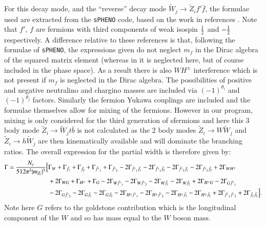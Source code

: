 \documentclass[final,3p,times,pdflatex]{elsarticle}
\begin{document}
For this decay mode, and the ``reverse'' decay mode $\tilde{W}_j \rightarrow
\tilde{Z}_i f' \bar{f}$, the formulae used are extracted from the {\tt sPHENO}
code, based on the work in references \cite{Baer:1998, TataBaer}. Note that
$f'$, $f$ are fermions with third components of weak isospin $1 \over 2$ and
$-{1 \over 2}$ respectively. A difference relative to these references is
that, following the formulae of {\tt sPHENO}, the expressions given do not
neglect $m_f$ in the Dirac algebra of the squared matrix element (whereas in
\cite{Baer:1998, TataBaer} it is neglected here, but of course included in the
phase space). As a result there is also $WH^{\pm}$ interference which is not
present if $m_f$ is neglected in the Dirac algebra. The possibilities of
positive and negative neutralino and chargino masses are included via
$(-1)^{\theta_{i}}$ and $(-1)^{\theta_{j}}$ factors. Similarly the fermion
Yukawa couplings are included and the formulae themselves allow for mixing of
the fermions. However in our program, mixing is only considered for the third
generation of sfermions and here this 3 body mode $\tilde{Z}_i \rightarrow
\tilde{W}_j t \bar{b}$ is not calculated as the 2 body modes $\tilde{Z}_i
\rightarrow W \tilde{W}_j$ and $\tilde{Z}_i \rightarrow h \tilde{W}_j$ are
then kinematically available and will dominate the branching ratios. 
The overall expression for the partial width is therefore given by:
\begin{equation} \label{neutchff}
\begin{aligned}
\Gamma = {N_{c} \over 512 \pi^3 |m_{Z_{i}}|^3}\Big[ & \Gamma_W + \Gamma_{\tilde{f}_1} + \Gamma_{\tilde{f}_2} + \Gamma_{\tilde{f'}_1} + \Gamma_{\tilde{f'}_2} -2\Gamma_{\tilde{f'}_{1} \tilde{f}_1} - 2\Gamma_{\tilde{f'}_{1}\tilde{f}_2} - 2\Gamma_{\tilde{f'}_{2}\tilde{f}_1} - 2\Gamma_{\tilde{f'}_{2}\tilde{f}_2} + 2\Gamma_{W H^{\pm}} \\ & + 2\Gamma_{W G} + \Gamma_{H^{\pm}} + \Gamma_{G} - 2\Gamma_{W \tilde{f'}_1} - 2\Gamma_{W \tilde{f'}_2} - 2\Gamma_{W \tilde{f}_1} - 2\Gamma_{W \tilde{f}_2} + 2\Gamma_{H^{\pm} G} - 2\Gamma_{G \tilde{f'}_1}  \\ & - 2\Gamma_{G \tilde{f'}_2} - 2\Gamma_{G \tilde{f}_1} - 2\Gamma_{G \tilde{f}_2} - 2\Gamma_{H^{\pm} \tilde{f'}_1} - 2\Gamma_{H^{\pm} \tilde{f'}_2} - 2\Gamma_{H^{\pm} \tilde{f}_1} - 2\Gamma_{H^{\pm} \tilde{f}_2} + 2\Gamma_{\tilde{f'}_1 \tilde{f'}_2} + 2\Gamma_{\tilde{f}_1 \tilde{f}_2} \Big].
\end{aligned}
\end{equation}
Note here $G$ refers to the goldstone contribution which is the longitudinal component of the $W$ and so has mass equal to the $W$ boson mass.
\end{document}
